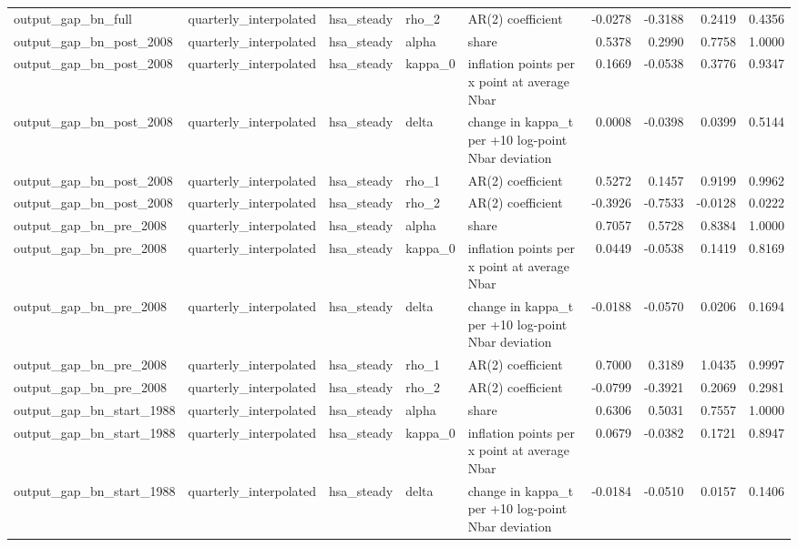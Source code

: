 \begin{tabular}{lllllrrrr}
output\_gap\_bn\_full & quarterly\_interpolated & hsa\_steady & rho\_2 & AR(2) coefficient & -0.0278 & -0.3188 & 0.2419 & 0.4356 \\
output\_gap\_bn\_post\_2008 & quarterly\_interpolated & hsa\_steady & alpha & share & 0.5378 & 0.2990 & 0.7758 & 1.0000 \\
output\_gap\_bn\_post\_2008 & quarterly\_interpolated & hsa\_steady & kappa\_0 & inflation points per x point at average Nbar & 0.1669 & -0.0538 & 0.3776 & 0.9347 \\
output\_gap\_bn\_post\_2008 & quarterly\_interpolated & hsa\_steady & delta & change in kappa\_t per +10 log-point Nbar deviation & 0.0008 & -0.0398 & 0.0399 & 0.5144 \\
output\_gap\_bn\_post\_2008 & quarterly\_interpolated & hsa\_steady & rho\_1 & AR(2) coefficient & 0.5272 & 0.1457 & 0.9199 & 0.9962 \\
output\_gap\_bn\_post\_2008 & quarterly\_interpolated & hsa\_steady & rho\_2 & AR(2) coefficient & -0.3926 & -0.7533 & -0.0128 & 0.0222 \\
output\_gap\_bn\_pre\_2008 & quarterly\_interpolated & hsa\_steady & alpha & share & 0.7057 & 0.5728 & 0.8384 & 1.0000 \\
output\_gap\_bn\_pre\_2008 & quarterly\_interpolated & hsa\_steady & kappa\_0 & inflation points per x point at average Nbar & 0.0449 & -0.0538 & 0.1419 & 0.8169 \\
output\_gap\_bn\_pre\_2008 & quarterly\_interpolated & hsa\_steady & delta & change in kappa\_t per +10 log-point Nbar deviation & -0.0188 & -0.0570 & 0.0206 & 0.1694 \\
output\_gap\_bn\_pre\_2008 & quarterly\_interpolated & hsa\_steady & rho\_1 & AR(2) coefficient & 0.7000 & 0.3189 & 1.0435 & 0.9997 \\
output\_gap\_bn\_pre\_2008 & quarterly\_interpolated & hsa\_steady & rho\_2 & AR(2) coefficient & -0.0799 & -0.3921 & 0.2069 & 0.2981 \\
output\_gap\_bn\_start\_1988 & quarterly\_interpolated & hsa\_steady & alpha & share & 0.6306 & 0.5031 & 0.7557 & 1.0000 \\
output\_gap\_bn\_start\_1988 & quarterly\_interpolated & hsa\_steady & kappa\_0 & inflation points per x point at average Nbar & 0.0679 & -0.0382 & 0.1721 & 0.8947 \\
output\_gap\_bn\_start\_1988 & quarterly\_interpolated & hsa\_steady & delta & change in kappa\_t per +10 log-point Nbar deviation & -0.0184 & -0.0510 & 0.0157 & 0.1406 \\

\end{tabular}
